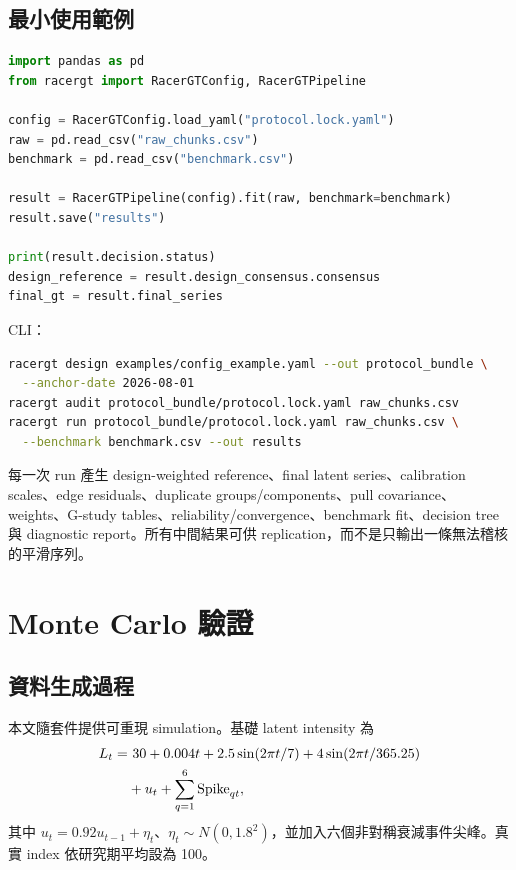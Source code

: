 \documentclass[12pt,a4paper,oneside]{article}
\begin{document}
\subsection{最小使用範例}

\begin{lstlisting}[language=Python]
import pandas as pd
from racergt import RacerGTConfig, RacerGTPipeline

config = RacerGTConfig.load_yaml("protocol.lock.yaml")
raw = pd.read_csv("raw_chunks.csv")
benchmark = pd.read_csv("benchmark.csv")

result = RacerGTPipeline(config).fit(raw, benchmark=benchmark)
result.save("results")

print(result.decision.status)
design_reference = result.design_consensus.consensus
final_gt = result.final_series
\end{lstlisting}

CLI：
\begin{lstlisting}[language=bash]
racergt design examples/config_example.yaml --out protocol_bundle \
  --anchor-date 2026-08-01
racergt audit protocol_bundle/protocol.lock.yaml raw_chunks.csv
racergt run protocol_bundle/protocol.lock.yaml raw_chunks.csv \
  --benchmark benchmark.csv --out results
\end{lstlisting}

每一次 run 產生 design-weighted reference、final latent series、calibration scales、edge residuals、duplicate groups/components、pull covariance、weights、G-study tables、reliability/convergence、benchmark fit、decision tree 與 diagnostic report。所有中間結果可供 replication，而不是只輸出一條無法稽核的平滑序列。

\section{Monte Carlo 驗證}
\label{sec:montecarlo}

\subsection{資料生成過程}

本文隨套件提供可重現 simulation。基礎 latent intensity 為
\begin{align}
L_t=&\ 30+0.004t+2.5\sin(2\pi t/7)
+4\sin(2\pi t/365.25)\notag\\
&+u_t+\sum_{q=1}^{6}\operatorname{Spike}_{qt},
\end{align}
其中 $u_t=0.92u_{t-1}+\eta_t$、$\eta_t\sim N(0,1.8^2)$，並加入六個非對稱衰減事件尖峰。真實 index 依研究期平均設為 100。
\end{document}
